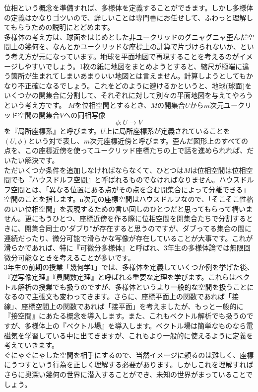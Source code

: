 位相という概念を準備すれば、多様体を定義することができます。しかし多様体の定義はかなりゴツいので、詳しいことは専門書にお任せして、ふわっと理解してもらうための説明にとどめます。\\
多様体の考え方は、球面をはじめとした非ユークリッドのグニャグニャ歪んだ空間上の幾何を、なんとかユークリッドな座標上の計算で片づけられないか、という考え方が元になっています。地球を平面地図で再現することを考えるのがイメージしやすいでしょう。1枚の紙に地図をまとめようとすると、縮尺が極端に違う箇所が生まれてしまいあまりいい地図とは言えません。計算しようとしてもかなり不正確になるでしょう。これをどのように避けるかというと、地球(球面)をいくつかの開集合に分割して、それぞれに対して別々の平面地図を与えてやろうという考え方です。
$M$を位相空間とするとき、$M$の開集合$U$から$m$次元ユークリッド空間の開集合$V$への同相写像
\[
\phi : U \rightarrow V
\]
を『局所座標系』と呼びます。$U$上に局所座標系が定義されていることを$(U,\phi)$という対で表し、$m$次元座標近傍と呼びます。歪んだ図形上のすべての点を、この座標近傍を使ってユークリッド座標たちの上で話を進められれば、だいたい解決です。\\
ただいくつか条件を追加しなければならなくて、ひとつは$M$は位相空間は位相空間でも『ハウスドルフ空間』と呼ばれるものでなければなりません。ハウスドルフ空間とは、「異なる位置にある点がその点を含む開集合によって分離できる」空間のことを指します。n次元の座標空間はハウスドルフなので、「そこそこ性格のいい位相空間」を表現するための言い回しのひとつだと思ってもらって構いません。更にもうひとつ、座標近傍を作る際に位相空間を開集合たちで分割するときに、開集合同士の"ダブり"が存在すると思うのですが、ダブってる集合の間に連続だったり、微分可能で滑らかな写像が存在していることが大事です。これが滑らかであれば、特に『可微分多様体』と呼ばれ、3年生の多様体論では無限回微分可能なときを考えることが多いです。\\
3年生の前期の授業「幾何学1」では、多様体を定義していくつか例を挙げた後、『逆写像定理』『員関数定理』と呼ばれる重要な定理を学びます。これらはベクトル解析の授業でも扱うのですが、多様体というより一般的な空間を扱うことになるので主張文も変わってきます。さらに、座標平面上の関数であれば「接線」、座標空間上の関数であれば「接平面」を考えましたが、もっと一般的に『接空間』にあたる概念を導入します。また、これもベクトル解析でも扱うのですが、多様体上の『ベクトル場』を導入します。ベクトル場は簡単なものなら電磁気を学習している中に出てきますが、これもより一般的に使えるように定義を考えていきます。\\
ぐにゃぐにゃした空間を相手にするので、当然イメージに頼るのは難しく、座標にうつすという行為を正しく理解する必要があります。しかしこれを理解すればさらに奥深い幾何の世界に潜入することができ、未知の世界がまっていることでしょう。